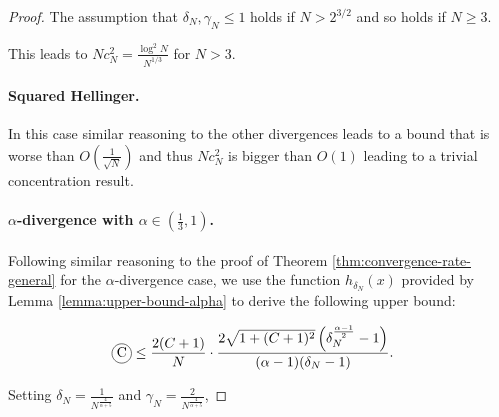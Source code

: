 \begin{proof}
The assumption that $\delta_N, \gamma_N \leq 1$ holds if $N>2^{3/2}$ and so holds if $N\geq3$.

This leads to $Nc_N^2 = \frac{\log^2N}{N^{1/3}}$ for $N> 3$.


\paragraph{Squared Hellinger.}

In this case similar reasoning to the other divergences leads to a bound that is worse than $O\left(\frac{1}{\sqrt{N}}\right)$ and thus $Nc^2_N$ is bigger than $O(1)$ leading to a trivial concentration result.

\paragraph{$\alpha$-divergence with $\alpha\in(\frac{1}{3},1)$.}

Following similar reasoning to the proof of Theorem \ref{thm:convergence-rate-general} for the $\alpha$-divergence case, we use the function $h_{\delta_N}(x)$ provided by Lemma \ref{lemma:upper-bound-alpha} to derive the following upper bound:

\begin{align*}
    \encircle{C} &\leq \frac{2(C+1)}{N} \cdot \frac{2\sqrt{1+(C+1)^2}\left(\delta_N^\frac{\alpha-1}{2} - 1\right)}{(\alpha - 1) (\delta_N- 1)}.
\end{align*}


Setting $\delta_N = \frac{1}{N^\frac{4}{\alpha+5}}$ and $\gamma_N = \frac{2}{N^\frac{4}{\alpha+5}}$,


\end{proof}
